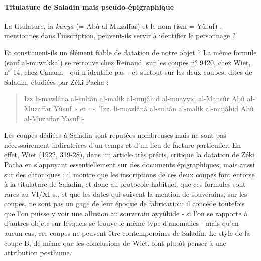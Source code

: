 \paragraph{Titulature de Saladin mais pseudo-épigraphique}
La titulature, la \textit{kunya} (= Abû al-Muzaffar) et le nom (ism = Yûsuf) , mentionnés dans l'inscription, peuvent-ils servir à identifier le personnage ?

Et constituent-ils un élément fiable de datation de notre objet ? La même formule (sauf al-muwakkal) se retrouve chez Reinaud, sur les coupes n° 9420, chez Wiet, n° 14, chez Canaan - qui n'identifie pas - et surtout sur les deux coupes, dites de Saladin, étudiées par Zéki Pacha : \begin{quote}
     Izz li-mawlâna al-sultân al-malik al-mujâhid al-muayyid al-Mansûr Abû al-Muzaffar Yûsuf » et : « 'Izz. li-mawlânâ al-sultân al-malik al-mujâhid Abû al-Muzaffar Yasuf »
\end{quote} Les coupes dédiées à Saladin sont réputées nombreuses   mais ne sont pas nécessairement indicatrices d'un temps et d'un lieu de facture particulier. 
En effet, Wiet (1922, 319-28), dans un article très précis, critique la datation de Zéki Pacha en s'appuyant essentiellement sur des documents épigraphiques, mais aussi sur des chroniques : il montre que les inscriptions de ces deux coupes font entorse à la titulature de Saladin, et donc au protocole habituel, que ces formules sont rares au VI/XI s., et que les dates qui suivent la mention de souverains, sur les coupes, ne sont pas un gage de leur époque de fabrication; il concède toutefois que l'on puisse y voir une allusion au souverain ayyûbide - si l'on se rapporte à d'autres objets sur lesquels se trouve le même type d'anomalies - mais qu'en aucun cas, ces coupes ne peuvent être contemporaines de Saladin. Le style de la coupe B, de même que les conclusions de Wiet, font plutôt penser à une attribution posthume.
